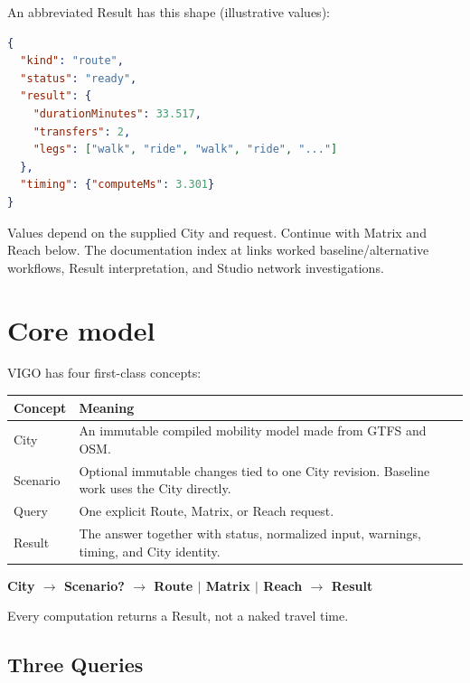 \documentclass[10pt,letterpaper]{article}
\begin{document}
An abbreviated Result has this shape (illustrative values):

\begin{lstlisting}[language=json]
{
  "kind": "route",
  "status": "ready",
  "result": {
    "durationMinutes": 33.517,
    "transfers": 2,
    "legs": ["walk", "ride", "walk", "ride", "..."]
  },
  "timing": {"computeMs": 3.301}
}
\end{lstlisting}

Values depend on the supplied City and request. Continue with Matrix and Reach below. The documentation index at  links worked baseline/alternative workflows, Result interpretation, and Studio network investigations.

\section{Core model}

VIGO has four first-class concepts:

\begin{center}
\begin{tabularx}{\linewidth}{P{1.0in} Y}
\toprule
\textbf{Concept} & \textbf{Meaning} \\
\midrule
City & An immutable compiled mobility model made from GTFS and OSM. \\
Scenario & Optional immutable changes tied to one City revision. Baseline work uses the City directly. \\
Query & One explicit Route, Matrix, or Reach request. \\
Result & The answer together with status, normalized input, warnings, timing, and City identity. \\
\bottomrule
\end{tabularx}
\end{center}

\begin{center}
\sffamily\bfseries\color{VigoTeal}
City $\longrightarrow$ Scenario? $\longrightarrow$ Route $\mid$ Matrix $\mid$ Reach $\longrightarrow$ Result
\end{center}

Every computation returns a Result, not a naked travel time.

\subsection{Three Queries}
\end{document}
